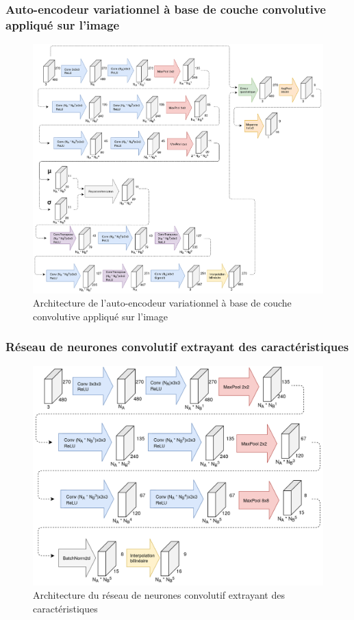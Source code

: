 \subsubsection{Auto-encodeur variationnel à base de couche convolutive appliqué sur l'image}
    \begin{figure}[H]
        \centering
        \includegraphics[width=17cm]{images/Architecture_CnnVae.png}
        \caption{Architecture de l'auto-encodeur variationnel à base de couche convolutive appliqué sur l'image}
        \label{fig:architecture_cnn_vae}
    \end{figure}

\subsubsection{Réseau de neurones convolutif extrayant des caractéristiques}
    \begin{figure}[H]
        \centering
        \includegraphics[width=17cm]{images/Architecture_SmallCnnWithAutoencoder.png}
        \caption{Architecture du réseau de neurones convolutif extrayant des caractéristiques}
        \label{fig:architecture_small_cnn}
    \end{figure}

